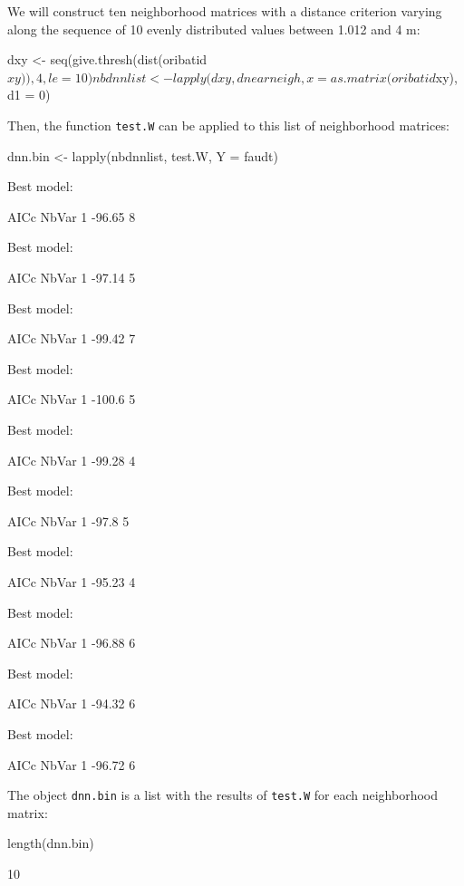 \documentclass[a4paper]{article}
\begin{document}
We will construct ten neighborhood matrices with a distance criterion varying along the sequence of 10 evenly distributed values between 1.012 and 4 m:
\begin{Schunk}
\begin{Sinput}
 dxy <- seq(give.thresh(dist(oribatid$xy)), 4, le = 10)
 nbdnnlist <- lapply(dxy, dnearneigh, x = as.matrix(oribatid$xy), 
     d1 = 0)
\end{Sinput}
\end{Schunk}
Then, the function \texttt{test.W} can be applied to this list of neighborhood matrices:
\begin{Schunk}
\begin{Sinput}
 dnn.bin <- lapply(nbdnnlist, test.W, Y = faudt)
\end{Sinput}
\begin{Soutput}
Best model:


    AICc NbVar
1 -96.65     8


Best model:


    AICc NbVar
1 -97.14     5


Best model:


    AICc NbVar
1 -99.42     7


Best model:


    AICc NbVar
1 -100.6     5


Best model:


    AICc NbVar
1 -99.28     4


Best model:


   AICc NbVar
1 -97.8     5


Best model:


    AICc NbVar
1 -95.23     4


Best model:


    AICc NbVar
1 -96.88     6


Best model:


    AICc NbVar
1 -94.32     6


Best model:


    AICc NbVar
1 -96.72     6
\end{Soutput}
\end{Schunk}
The object \texttt{dnn.bin} is a list with the results of \texttt{test.W} for each neighborhood matrix:
\begin{Schunk}
\begin{Sinput}
 length(dnn.bin)
\end{Sinput}
\begin{Soutput}
[1] 10
\end{Soutput}
\end{Schunk}
\end{document}
